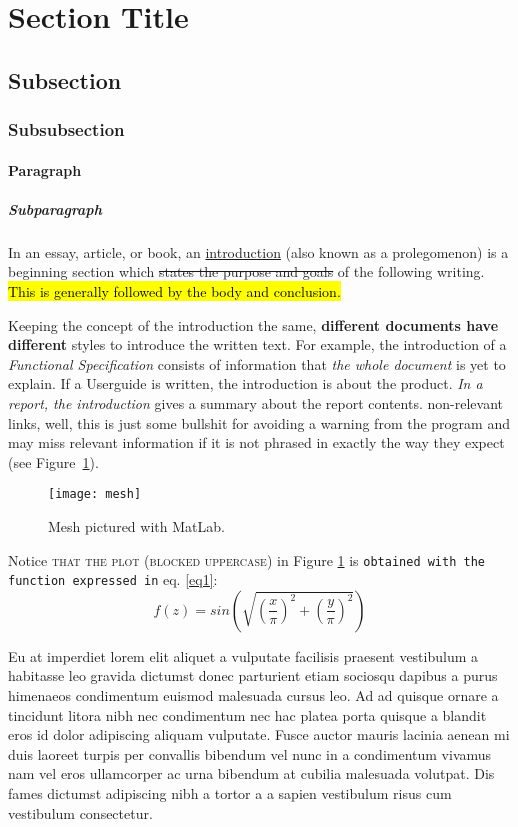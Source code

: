 \section{Section Title}

\subsection{Subsection}

\subsubsection{Subsubsection}

\paragraph{Paragraph}

\subparagraph{Subparagraph}

In an essay, article, or book, an \ul{introduction} (also known as a prolegomenon) is a beginning section which \st{states the purpose and goals} of the following writing. \hl{This is generally followed by the body and conclusion.}

Keeping the concept of the introduction the same, \textbf{different documents have different} styles to introduce the written text. For example, the introduction of a \textit{Functional Specification} consists of information that \textit{the whole document} is yet to explain. If a Userguide is written, the introduction is about the product. \textsl{In a report, the introduction} gives a summary about the report contents. \cite{kimura1982current} non-relevant links, well, this is just some bullshit for avoiding a warning from the program and may miss relevant information \textsf{if it is not phrased} in exactly the way they expect (see Figure~\ref{fig:mesh}).
\begin{figure}[h]
    \centering
    \texttt{[image: mesh]}
    \caption{Mesh pictured with MatLab.}
    \label{fig:mesh}
\end{figure}

Notice \textsc{that the plot (blocked uppercase)} in Figure \ref{fig:mesh} is \texttt{obtained with the function expressed in} eq. \ref{eq1}:
\begin{equation}\label{eq1}
f(z)=sin\left(\sqrt{\left(\frac{x}{\pi}\right)^2+\left(\frac{y}{\pi}\right)^2}\right)
\end{equation}

Eu at imperdiet lorem elit aliquet a vulputate facilisis praesent vestibulum a habitasse leo gravida dictumst donec parturient etiam sociosqu dapibus a purus himenaeos condimentum euismod malesuada cursus leo. Ad ad quisque ornare a tincidunt litora nibh nec condimentum nec hac platea porta quisque a blandit eros id dolor adipiscing aliquam vulputate. Fusce auctor mauris lacinia aenean mi duis laoreet turpis per convallis bibendum vel nunc in a condimentum vivamus nam vel eros ullamcorper ac urna bibendum at cubilia malesuada volutpat. Dis fames dictumst adipiscing nibh a tortor a a sapien vestibulum risus cum vestibulum consectetur.

